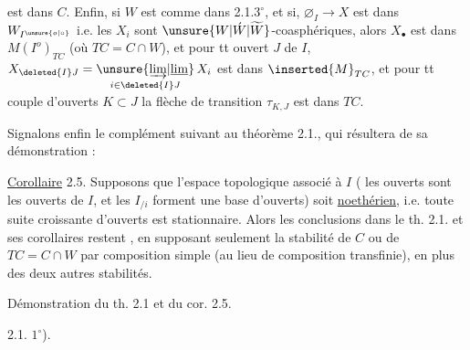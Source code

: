 

est dans $C$. Enfin, si $W$ est comme dans 2.1.$3^\circ$, et si, $\varnothing_I\longrightarrow X$ est dans $W_{I^{\unsure{o|\circ}}}$ i.e. les $X_i$ sont $\unsure{W|\acute W|\widetilde W}$-coasphériques, alors \deleted{\unsure{$\varnothing$}} $X_\bullet$ est dans $M(I^o)_{TC}$ (où $TC=C\cap W$), et pour tt ouvert $J$ de $I$, $X_{\deleted{I}J}=\underset{i\in\deleted{I}J}{\unsure{\underrightarrow{\lim}|\underline{\lim}}}\,X_i$ est dans $\inserted{M}_{TC}$,  et pour tt couple d'ouverts $K\subset J$ la flèche de transition $\tau_{K,J}$ est dans $TC$.

Signalons enfin le complément suivant au théorème 2.1., qui résultera de sa démonstration :

\uline{Corollaire} 2.5. Supposons que l'espace topologique associé à $I$ ( les ouverts sont les ouverts de $I$, et les $I_{/i}$ forment une base d'ouverts) soit \uline{noethérien}, i.e. toute suite croissante d'ouverts est stationnaire. Alors  les conclusions dans le th. 2.1. et ses corollaires restent , en supposant seulement la stabilité de $C$ ou de $TC=C\cap W$ par composition simple (au lieu de composition transfinie), en plus des deux autres stabilités.




Démonstration du th. 2.1 et du cor. 2.5.

2.1. $1^\circ$). 



